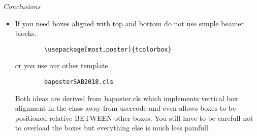 \alert{\textit{Conclusions}}
\begin{itemize}
   \item
     If you need boxes aligned with top and bottom do not use simple beamer blocks.
     \begin{verbatim}
        \usepackage[most,poster]{tcolorbox}
     \end{verbatim}
     or you use our other template
     \begin{verbatim}
        baposterSAB2018.cls
     \end{verbatim}
     Both ideas are derived from baposter.cls
     which implements vertical box alignment in the class away 
     from usercode and even allows boxes to be positioned relative BETWEEN other
     boxes. 
     You still have to be carefull not to overload the boxes but everything else is much less painfull.
\end{itemize}
\vspace{1cm}
